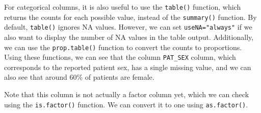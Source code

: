 \documentclass[
  letterpaper,
]{latex/krantz}
\makeatletter
\newenvironment{Shaded}{\begin{snugshade}}{\end{snugshade}}
\newcommand{\AttributeTok}[1]{\textcolor[rgb]{0.40,0.45,0.13}{#1}}
\newcommand{\CommentTok}[1]{\textcolor[rgb]{0.37,0.37,0.37}{#1}}
\newcommand{\FunctionTok}[1]{\textcolor[rgb]{0.28,0.35,0.67}{#1}}
\newcommand{\NormalTok}[1]{\textcolor[rgb]{0.00,0.23,0.31}{#1}}
\newcommand{\SpecialCharTok}[1]{\textcolor[rgb]{0.37,0.37,0.37}{#1}}
\newcommand{\StringTok}[1]{\textcolor[rgb]{0.13,0.47,0.30}{#1}}
\newenvironment{kframe}{%
\medskip{}
\setlength{\fboxsep}{.8em}
 \def\at@end@of@kframe{}%
 \ifinner\ifhmode%
  \def\at@end@of@kframe{\end{minipage}}%
  \begin{minipage}{\columnwidth}%
 \fi\fi%
 \def\FrameCommand##1{\hskip\@totalleftmargin \hskip-\fboxsep
 \colorbox{shadecolor}{##1}\hskip-\fboxsep
     \hskip-\linewidth \hskip-\@totalleftmargin \hskip\columnwidth}%
 \MakeFramed {\advance\hsize-\width
   \@totalleftmargin\z@ \linewidth\hsize
   \@setminipage}}%
 {\par\unskip\endMakeFramed%
 \at@end@of@kframe}
\renewenvironment{Shaded}{\begin{kframe}}{\end{kframe}}
\makeatother
\begin{document}
\begin{Shaded}
\end{Shaded}

For categorical columns, it is also useful to use the
\texttt{table()} function,
which returns the counts for each possible value, instead of the
\texttt{summary()} function. By default, \texttt{table()} ignores NA
values. However, we can set \texttt{useNA="always"} if we also want to
display the number of NA values in the table output. Additionally, we
can use the
\texttt{prop.table()}
function to convert the counts to proportions. Using these functions, we
can see that the column \texttt{PAT\_SEX} column, which corresponds to
the reported patient sex, has a single missing value, and we can also
see that around 60\% of patients are female.

\begin{Shaded}
\end{Shaded}

\begin{Shaded}
\end{Shaded}

Note that this column is not actually a factor column yet, which we can
check using the \texttt{is.factor()} function. We can convert it to one
using \texttt{as.factor()}.

\begin{Shaded}
\end{Shaded}
\end{document}
